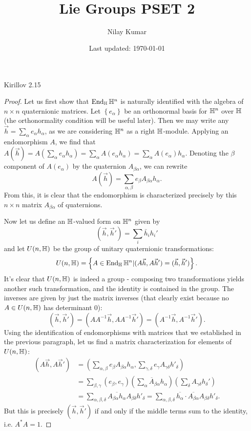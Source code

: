 \documentclass{../../mathnotes}
\title{Lie Groups PSET 2}
\author{Nilay Kumar}
\date{Last updated: \today}
\begin{document}
\maketitle

\begin{prop}
    Kirillov 2.15
\end{prop}
\begin{proof}
    Let us first show that $\operatorname{End}_{\mathbb{H}}\mathbb{H}^n$ is naturally identified with the algebra of $n\times n$ quaternionic matrices.
    Let $\left\{ e_\alpha \right\}$ be an orthonormal basis for $\mathbb{H}^n$ over $\mathbb{H}$ (the orthonormality condition will be useful later).
    Then we may write any $\vec h=\sum_\alpha e_\alpha h_\alpha$, as we are considering
    $\mathbb{H}^n$ as a right $\mathbb{H}$-module. Applying an endomorphism $A$, we find that $A(\vec h)=A\left( \sum_\alpha e_\alpha h_\alpha \right)
    =\sum_\alpha A(e_\alpha h_\alpha)=\sum_\alpha A(e_\alpha) h_\alpha$. Denoting the $\beta$ component of $A(e_\alpha)$ by the quaternion $A_{\beta\alpha}$,
    we can rewrite
    \[A(\vec h)=\sum_{\alpha,\beta}e_\beta A_{\beta\alpha}h_\alpha.\]
    From this, it is clear that the endomorphism is characterized precisely by this $n\times n$ matrix $A_{\beta\alpha}$ of quaternions.

    Now let us define an $\mathbb{H}$-valued form on $\mathbb{H}^n$ given by
    \[(\vec h,\vec h')=\sum_i\bar h_i h_i'\]
    and let $U(n,\mathbb{H})$ be the group of unitary quaternionic transformations:
    \[U(n,\mathbb{H})=\left\{ A\in\operatorname{End}_{\mathbb{H}}\mathbb{H}^n | (A\vec h,A\vec h')=(\vec h,\vec h') \right\}.\]
    It's clear that $U(n,\mathbb{H})$ is indeed a group - composing two transformations yields another such transformation, and the identity is contained in the
    group. The inverses are given by just the matrix inverses (that clearly exist because no $A\in U(n,\mathbb{H})$ has determinant 0):
    \[(\vec h,\vec h')=(AA^{-1}\vec h,AA^{-1}\vec h')=(A^{-1}\vec h,A^{-1}\vec h').\]
    Using the identification of endomorphisms with matrices that we established in the previous paragraph, let us find a matrix characterization
    for elements of $U(n,\mathbb{H})$:
    \begin{align*}
        (A\vec h, A\vec h')&=\left( \sum_{\alpha,\beta}e_\beta A_{\beta\alpha}h_{\alpha},\sum_{\gamma,\delta}e_\gamma A_{\gamma\delta} h'_\delta \right)\\
        &=\sum_{\beta,\gamma}(e_\beta,e_\gamma)\left( \overline{\sum_\alpha A_{\beta\alpha}h_\alpha} \right)\left( \sum_\delta A_{\gamma\delta}h_\delta' \right)\\
        &=\sum_{\alpha,\beta,\delta}\overline{A_{\beta\alpha} h_\alpha}A_{\beta\delta}h'_\delta
        =\sum_{\alpha,\beta,\delta}\overline{h_\alpha}\cdot\overline{A_{\beta\alpha}}A_{\beta\delta}h'_\delta.
    \end{align*}
    But this is precisely $(\vec h,\vec h')$ if and only if the middle terms sum to the identity, i.e. $A^*A=1$.


\end{proof}
\end{document}

